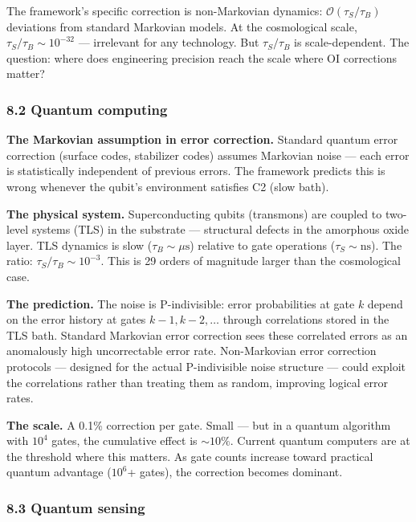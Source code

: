 \documentclass[
]{article}
\begin{document}
The framework's specific correction is non-Markovian dynamics:
\(\mathcal{O}(\tau_S / \tau_B)\) deviations from standard Markovian
models. At the cosmological scale, \(\tau_S / \tau_B \sim 10^{-32}\) ---
irrelevant for any technology. But \(\tau_S / \tau_B\) is
scale-dependent. The question: where does engineering precision reach
the scale where OI corrections matter?

\hypertarget{quantum-computing}{%
\subsubsection{8.2 Quantum computing}\label{quantum-computing}}

\textbf{The Markovian assumption in error correction.} Standard quantum
error correction (surface codes, stabilizer codes) assumes Markovian
noise --- each error is statistically independent of previous errors.
The framework predicts this is wrong whenever the qubit's environment
satisfies C2 (slow bath).

\textbf{The physical system.} Superconducting qubits (transmons) are
coupled to two-level systems (TLS) in the substrate --- structural
defects in the amorphous oxide layer. TLS dynamics is slow
(\(\tau_B \sim \mu\text{s}\)) relative to gate operations
(\(\tau_S \sim \text{ns}\)). The ratio:
\(\tau_S / \tau_B \sim 10^{-3}\). This is 29 orders of magnitude larger
than the cosmological case.

\textbf{The prediction.} The noise is P-indivisible: error probabilities
at gate \(k\) depend on the error history at gates \(k-1, k-2, \ldots\)
through correlations stored in the TLS bath. Standard Markovian error
correction sees these correlated errors as an anomalously high
uncorrectable error rate. Non-Markovian error correction protocols ---
designed for the actual P-indivisible noise structure --- could exploit
the correlations rather than treating them as random, improving logical
error rates.

\textbf{The scale.} A 0.1\% correction per gate. Small --- but in a
quantum algorithm with \(10^4\) gates, the cumulative effect is
\(\sim 10\%\). Current quantum computers are at the threshold where this
matters. As gate counts increase toward practical quantum advantage
(\(10^6\)+ gates), the correction becomes dominant.

\hypertarget{quantum-sensing}{%
\subsubsection{8.3 Quantum sensing}\label{quantum-sensing}}
\end{document}
